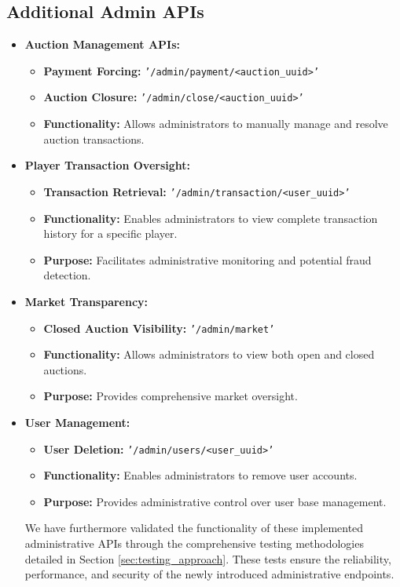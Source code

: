 \documentclass{article}
\begin{document}
\subsection{Additional Admin APIs}
\begin{itemize}
    \item \textbf{Auction Management APIs:}
        \begin{itemize}
            \item \textbf{Payment Forcing:} \texttt{'/admin/payment/<auction\_uuid>'}
            \item \textbf{Auction Closure:} \texttt{'/admin/close/<auction\_uuid>'}
            \item \textbf{Functionality:} Allows administrators to manually manage and resolve auction transactions.
        \end{itemize}

    \item \textbf{Player Transaction Oversight:}
        \begin{itemize}
            \item \textbf{Transaction Retrieval:} \texttt{'/admin/transaction/<user\_uuid>'}
            \item \textbf{Functionality:} Enables administrators to view complete transaction history for a specific player.
            \item \textbf{Purpose:} Facilitates administrative monitoring and potential fraud detection.
        \end{itemize}

    \item \textbf{Market Transparency:}
        \begin{itemize}
            \item \textbf{Closed Auction Visibility:} \texttt{'/admin/market'}
            \item \textbf{Functionality:} Allows administrators to view both open and closed auctions.
            \item \textbf{Purpose:} Provides comprehensive market oversight.
        \end{itemize}

    \item \textbf{User Management:}
        \begin{itemize}
            \item \textbf{User Deletion:} \texttt{'/admin/users/<user\_uuid>'}
            \item \textbf{Functionality:} Enables administrators to remove user accounts.
            \item \textbf{Purpose:} Provides administrative control over user base management.
        \end{itemize}
 We have furthermore validated the functionality of these implemented administrative APIs through the comprehensive testing methodologies detailed in Section \ref{sec:testing_approach}. These tests ensure the reliability, performance, and security of the newly introduced administrative endpoints.
\end{itemize}
\end{document}
